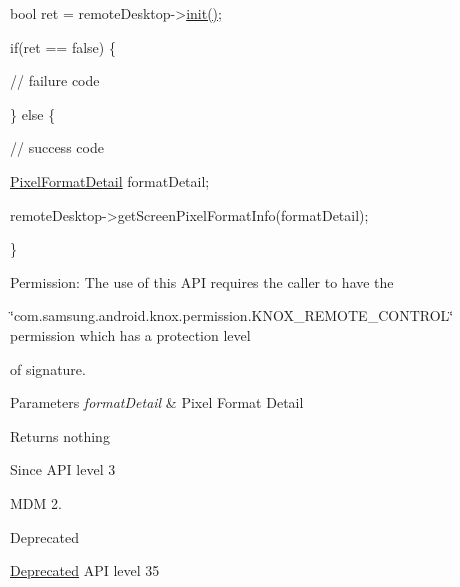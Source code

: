 \begin{DoxyPre}  bool ret = remoteDesktop->\hyperlink{classknoxremotedesktop_1_1IRemoteDesktop_a7bed40d98c61713a69cf1dad8b37beae}{init()};\end{DoxyPre}



\begin{DoxyPre}  if(ret == false)  \{\end{DoxyPre}



\begin{DoxyPre}     // failure code\end{DoxyPre}



\begin{DoxyPre}  \} else \{\end{DoxyPre}



\begin{DoxyPre}     // success code\end{DoxyPre}



\begin{DoxyPre}     \hyperlink{structknoxremotedesktop_1_1PixelFormatDetail}{PixelFormatDetail} formatDetail;\end{DoxyPre}



\begin{DoxyPre}     remoteDesktop->getScreenPixelFormatInfo(formatDetail);\end{DoxyPre}



\begin{DoxyPre}  \}\end{DoxyPre}



\begin{DoxyPre} \end{DoxyPre}


\begin{DoxyParagraph}{\-Permission\-: }
\-The use of this \-A\-P\-I requires the caller to have the
\end{DoxyParagraph}
\char`\"{}com.\-samsung.\-android.\-knox.\-permission.\-K\-N\-O\-X\-\_\-\-R\-E\-M\-O\-T\-E\-\_\-\-C\-O\-N\-T\-R\-O\-L\char`\"{} permission which has a protection level

of signature.


\begin{DoxyParams}{\-Parameters}
{\em format\-Detail} & \-Pixel \-Format \-Detail\\
\hline
\end{DoxyParams}
\begin{DoxyReturn}{\-Returns}
nothing
\end{DoxyReturn}
\begin{DoxySince}{\-Since}
\-A\-P\-I level 3

\-M\-D\-M 2.
\end{DoxySince}
\begin{DoxyRefDesc}{\-Deprecated}
\item[\hyperlink{deprecated__deprecated000030}{\-Deprecated}]\-A\-P\-I level 35\end{DoxyRefDesc}


